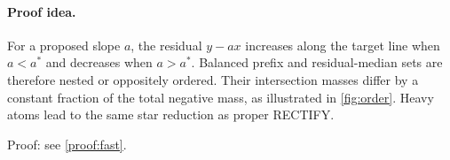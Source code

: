 \paragraph{Proof idea.}
For a proposed slope $a$, the residual $y-ax$ increases along the target line when $a<a^*$ and decreases when $a>a^*$. Balanced prefix and residual-median sets are therefore nested or oppositely ordered. Their intersection masses differ by a constant fraction of the total negative mass, as illustrated in \cref{fig:order}. Heavy atoms lead to the same star reduction as proper RECTIFY.

\noindent Proof: see \cref{proof:fast}.\par
